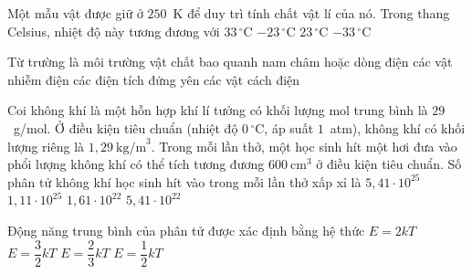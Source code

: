 	\begin{ex}%
		Một mẫu vật được giữ ở $250$~K để duy trì tính chất vật lí của nó. Trong thang Celsius, nhiệt độ này tương đương với
		\choice
		{$33\,^\circ\text{C}$}
		{\True $-23\,^\circ\text{C}$}
		{$23\,^\circ\text{C}$}
		{$-33\,^\circ\text{C}$}
	\end{ex}

	\begin{ex}%
		Từ trường là môi trường vật chất bao quanh
		\choice
		{\True nam châm hoặc dòng điện}
		{các vật nhiễm điện}
		{các điện tích đứng yên}
		{các vật cách điện}
	\end{ex}

	\begin{ex}%
		Coi không khí là một hỗn hợp khí lí tưởng có khối lượng mol trung bình là $29$~g/mol. Ở điều kiện tiêu chuẩn (nhiệt độ $0\,^\circ\text{C}$, áp suất $1$~atm), không khí có khối lượng riêng là $1{,}29~\text{kg/m}^3$. Trong mỗi lần thở, một học sinh hít một hơi đưa vào phổi lượng không khí có thể tích tương đương $600~\text{cm}^3$ ở điều kiện tiêu chuẩn. Số phân tử không khí học sinh hít vào trong mỗi lần thở xấp xỉ là
		\choice
		{$5{,}41\cdot 10^{25}$}
		{$1{,}11\cdot 10^{25}$}
		{\True $1{,}61\cdot 10^{22}$}
		{$5{,}41\cdot 10^{22}$}
	\end{ex}

	\begin{ex}%
		Động năng trung bình của phân tử được xác định bằng hệ thức
		\choice
		{$E=2kT$}
		{\True $E=\dfrac{3}{2}kT$}
		{$E=\dfrac{2}{3}kT$}
		{$E=\dfrac{1}{2}kT$}
	\end{ex}

